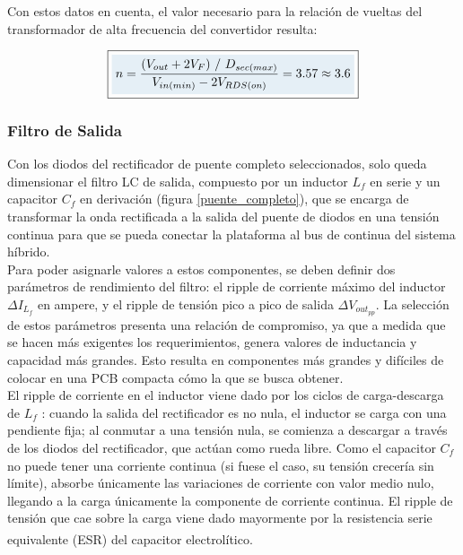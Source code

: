 Con estos datos en cuenta, el valor necesario para la relación de vueltas del transformador de alta frecuencia del convertidor resulta:

\begin{equation}\label{relacion_vueltas_valor}
    \boxed{
    \highlight{n = \frac{(V_{out}+2V_F)\ /\ D_{sec(max)}}{V_{in(min)}-2V_{RDS(on)}} = \num{3.57} \approx \num{3.6}}
    }
\end{equation}

\subsubsection{Filtro de Salida}

Con los diodos del rectificador de puente completo seleccionados, solo queda dimensionar el filtro LC de salida, compuesto por un inductor $L_f$ en serie y un capacitor $C_f$ en derivación (figura \ref{puente_completo}), que se encarga de transformar la onda rectificada a la salida del puente de diodos en una tensión continua para que se pueda conectar la plataforma al bus de continua del sistema híbrido.\\

Para poder asignarle valores a estos componentes, se deben definir dos parámetros de rendimiento del filtro: el ripple de corriente máximo del inductor $\Delta I_{L_f}$ en ampere, y el ripple de tensión pico a pico de salida $\Delta V_{out_{pp}}$. La selección de estos parámetros presenta una relación de compromiso, ya que a medida que se hacen más exigentes los requerimientos, genera valores de inductancia y capacidad más grandes. Esto resulta en componentes más grandes y difíciles de colocar en una PCB compacta cómo la que se busca obtener.\\

El ripple de corriente en el inductor viene dado por los ciclos de carga-descarga de $L_f$ : cuando la salida del rectificador es no nula, el inductor se carga con una pendiente fija; al conmutar a una tensión nula, se comienza a descargar a través de los diodos del rectificador, que actúan como rueda libre. Como el capacitor $C_f$ no puede tener una corriente continua (si fuese el caso, su tensión crecería sin límite), absorbe únicamente las variaciones de corriente con valor medio nulo, llegando a la carga únicamente la componente de corriente continua. El ripple de tensión que cae sobre la carga viene dado mayormente por la resistencia serie equivalente (ESR) del capacitor electrolítico.\textsuperscript{\cite{SoftSwitchPWM}}\\

